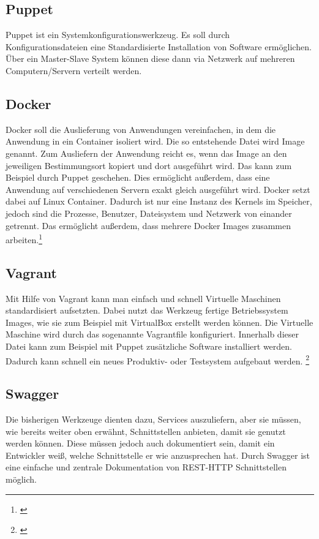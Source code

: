 \subsection{Puppet}
\label{subsec:puppet}
Puppet ist ein Systemkonfigurationswerkzeug. Es soll durch Konfigurationsdateien eine Standardisierte Installation von Software ermöglichen. Über ein Master-Slave System können diese dann via Netzwerk auf mehreren Computern/Servern verteilt werden.

\subsection{Docker}
\label{subsec:docker}
Docker soll die Auslieferung von Anwendungen vereinfachen, in dem die Anwendung in ein Container isoliert wird. Die so entstehende Datei wird Image genannt. Zum Ausliefern der Anwendung reicht es, wenn das Image an den jeweiligen Bestimmungsort kopiert und dort ausgeführt wird. Das kann zum Beispiel durch Puppet geschehen. Dies ermöglicht außerdem, dass eine Anwendung auf verschiedenen Servern exakt gleich ausgeführt wird.
Docker setzt dabei auf Linux Container. Dadurch ist nur eine Instanz des Kernels im Speicher, jedoch sind die Prozesse, Benutzer, Dateisystem und Netzwerk von einander getrennt. Das ermöglicht außerdem, dass mehrere Docker Images zusammen arbeiten.\footnote{\cite[vgl. S. 53 ff.]{EWolff2015:ContinuouosDelivery}}

\subsection{Vagrant}
\label{subesec:vagrant}
Mit Hilfe von Vagrant kann man einfach und schnell Virtuelle Maschinen standardisiert aufsetzten. Dabei nutzt das Werkzeug fertige Betriebssystem Images, wie sie zum Beispiel mit VirtualBox erstellt werden können. Die Virtuelle Maschine wird durch das sogenannte Vagrantfile konfiguriert. Innerhalb dieser Datei kann zum Beispiel mit Puppet zusätzliche Software installiert werden. Dadurch kann schnell ein neues Produktiv- oder Testsystem aufgebaut werden.
\footnote{\cite[vgl. S. 49 ff.]{EWolff2015:ContinuouosDelivery}}

\subsection{Swagger}
\label{subsec:swagger}
Die bisherigen Werkzeuge dienten dazu, Services auszuliefern, aber sie müssen, wie bereits weiter oben erwähnt, Schnittstellen anbieten, damit sie genutzt werden können. Diese müssen jedoch auch dokumentiert sein, damit ein Entwickler weiß, welche Schnittstelle er wie anzusprechen hat. Durch Swagger ist eine einfache und zentrale Dokumentation von REST-HTTP Schnittstellen möglich.

